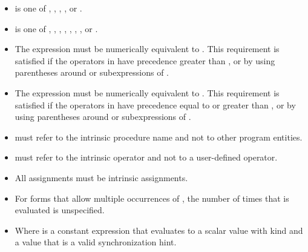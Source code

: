 \begin{fortranspecific}
\begin{itemize}
\item {} is one of , , , , or .


\item {} is one of \code{+}, \code{*}, \code{-}, \code{/}, , , , or .


\item The expression  must be numerically equivalent to .
This requirement is satisfied if the operators in  have precedence greater than
, or by using parentheses around  or subexpressions of .


\item The expression  must be numerically equivalent to . This requirement is satisfied if the operators in  have precedence equal to or
greater than , or by using parentheses around  or subexpressions of .


\item {} must refer to the intrinsic procedure name and not to other
program entities.


\item {} must refer to the intrinsic operator and not to a user-defined operator.


\item All assignments must be intrinsic assignments.


\item For forms that allow multiple occurrences of , the number of times that  is
evaluated is unspecified.

\item Where  is a constant expression that evaluates to a scalar value with kind
  and a value that is a valid synchronization hint.
\end{itemize}
\end{fortranspecific}


